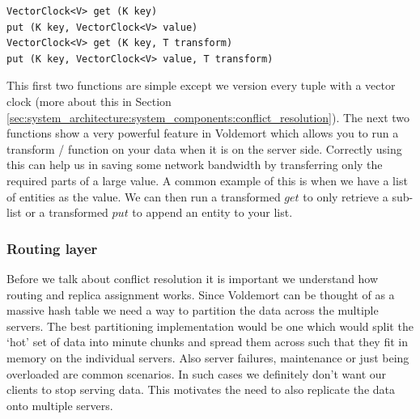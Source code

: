 \documentclass[10pt,twocolumn,preprint,natbib,authoryear]{sigplanconf}
\begin{document}
\scriptsize
\begin{verbatim}
VectorClock<V> get (K key)
put (K key, VectorClock<V> value)
VectorClock<V> get (K key, T transform)
put (K key, VectorClock<V> value, T transform)
\end{verbatim}
\normalsize

This first two functions are simple except we version every tuple with a vector clock (more about this in Section \ref{sec:system_architecture:system_components:conflict_resolution}). The next two functions show a very powerful feature in Voldemort which allows you to run a transform / function on your data when it is on the server side. Correctly using this can help us in saving some network bandwidth by transferring only the required parts of a large value. A common example of this is when we have a list of entities as the value. We can then run a transformed $get$ to only retrieve a sub-list or a transformed $put$ to append an entity to your list. 


\subsubsection {Routing layer }  
\label{sec:system_architecture:system_components:routing_layer}

Before we talk about conflict resolution it is important we understand how routing and replica assignment works. Since Voldemort can be thought of as a massive hash table we need a way to partition the data across the multiple servers. The best partitioning implementation would be one which would split the `hot' set of data into minute chunks and spread them across such that they fit in memory on the individual servers. Also server failures, maintenance or just being overloaded are common scenarios. In such cases we definitely don't want our clients to stop serving data. This motivates the need to also replicate the data onto multiple servers. 
\end{document}
